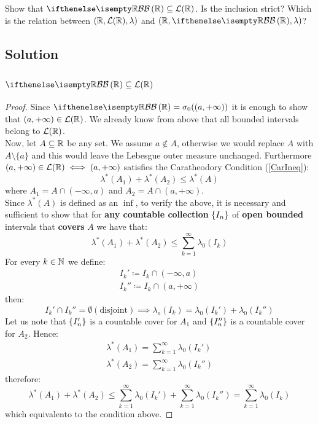 

\question
Show that $\B[\R] \subseteq \Leb(\R)$. Is the inclusion strict? Which is the relation between $(\mathbb{R},\mathcal{L}(\mathbb{R}), \lambda)$ and
$(\R, \B[\R], \lambda)$?

\subsection*{Solution}

\subsection{\texorpdfstring{$\B[\R] \subseteq \Leb(\R)$}{B(R) is included in L(R)}}
\begin{proof}
    Since $\B[\R]=\sigma_0((a,+\infty))$ it is enough to show that $(a,+\infty)\in\mathcal{L}(\mathbb{R})$. We already know from above that all bounded intervals belong to $\mathcal{L}(\mathbb{R})$. \\
    Now, let $A\subseteq\mathbb{R}$ be any set. We assume $a\notin A$, otherwise we would replace $A$ with $A\setminus\{a\}$ and this would leave the Lebesgue outer measure unchanged. Furthermore $(a,+\infty)\in\mathcal{L}(\mathbb{R}) \iff (a,+\infty)$ satisfies the Caratheodory Condition (\ref{CarIneq}):
    \[
        \lambda^*(A_1)+\lambda^*(A_2)\leq\lambda^*(A) \label{a}
    \]
    where $A_1 = A\cap (-\infty,a)$ and $A_2 = A \cap (a,+\infty)$.\\
    Since $\lambda^*(A)$ is defined as an $\inf$, to verify the above, it is necessary and sufficient to show that for \textbf{any countable collection} $\{ I_n \}$ of \textbf{open bounded} intervals that \textbf{covers} $A$ we have that:
    \[
        \lambda^*(A_1)+\lambda^*(A_2)\leq \sum_{k=1}^{\infty} \lambda_0(I_k)
    \]
    For every $k\in\mathbb{N}$ we define:
    \begin{align*}
        I_k' \coloneqq I_k \cap (-\infty, a) \\
        I_k'' \coloneqq I_k \cap (a,+\infty)
    \end{align*}
    then:
    \[
        I_k' \cap I_k'' = \emptyset (\text{disjoint}) \implies \lambda_o(I_k) = \lambda_0(I_k') + \lambda_0 (I_k'')
    \]
    Let us note that $\{ I'_n \}$ is a countable cover for $A_1$ and $\{ I''_n \}$ is a countable cover for $A_2$.
    Hence:
    \begin{align*}
        \lambda^*(A_1)=\sum_{k=1}^{\infty} \lambda_0(I_k') \\
        \lambda^*(A_2)=\sum_{k=1}^{\infty} \lambda_0(I_k'')
    \end{align*}
    therefore:
    \[
        \lambda^*(A_1)+\lambda^*(A_2)\leq \sum_{k=1}^{\infty} \lambda_0(I_k') + \sum_{k=1}^{\infty} \lambda_0(I_k'') = \sum_{k=1}^{\infty} \lambda_0(I_k)
    \]
    which equivalento to the condition above.
\end{proof}

